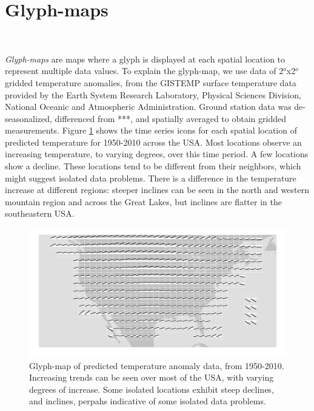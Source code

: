 \documentclass[oneside]{article}
\begin{document}
\section{Glyph-maps}~\label{sec:glyph-map}

\emph{Glyph-maps} are maps where a glyph is displayed at each spatial location to represent multiple data values. To explain the glyph-map, we use data of 2$^o$x2$^o$ gridded temperature anomalies, from the GISTEMP surface temperature data provided by the Earth System Research Laboratory, Physical Sciences Division, National Oceanic and Atmospheric Administration. Ground station data was de-seasonalized, differenced from ***, and spatially averaged to obtain gridded measurements. Figure \ref{fig:gistemp-pred} shows the time series icons for each spatial location of predicted temperature for 1950-2010 across the USA. Most locations observe an increasing temperature, to varying degrees, over this time period. A few locations show a decline. These locations tend to be different from their neighbors, which might suggest isolated data problems. There is a difference in the temperature increase at different regions: steeper inclines can be seen in the north and western mountain region and across the Great Lakes, but inclines are flatter in the southeastern USA. 

\begin{figure}[htbp]
  \centering
  \includegraphics[width=1\linewidth]{gistemp-pred}%


  \caption{Glyph-map of predicted temperature anomaly data, from
    1950-2010. Increasing trends can be seen over most of the USA,
    with varying degrees of increase. Some isolated locations exhibit
    steep declines, and inclines, perpahs indicative of some isolated
    data problems.}
  \label{fig:gistemp-pred}
\end{figure}
\end{document}
